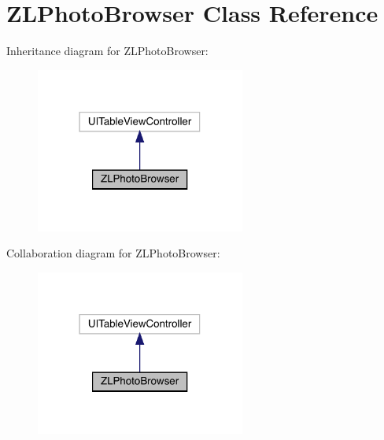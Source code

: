 \hypertarget{interface_z_l_photo_browser}{}\section{Z\+L\+Photo\+Browser Class Reference}
\label{interface_z_l_photo_browser}


Inheritance diagram for Z\+L\+Photo\+Browser\+:\nopagebreak
\begin{figure}[H]
\begin{center}
\leavevmode
\includegraphics[width=195pt]{interface_z_l_photo_browser__inherit__graph}
\end{center}
\end{figure}


Collaboration diagram for Z\+L\+Photo\+Browser\+:\nopagebreak
\begin{figure}[H]
\begin{center}
\leavevmode
\includegraphics[width=195pt]{interface_z_l_photo_browser__coll__graph}
\end{center}
\end{figure}
